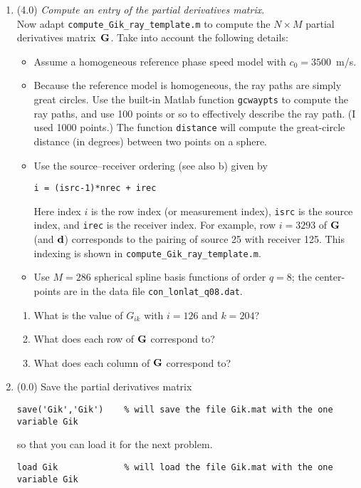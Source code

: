 \documentclass[11pt,titlepage,fleqn]{article}
\begin{document}
\begin{enumerate}

\item (4.0) {\em Compute an entry of the partial derivatives matrix}. \\
Now adapt \verb+compute_Gik_ray_template.m+ to compute the $N \times M$ partial derivatives matrix~$\mbox{${\bf G}$}$.
Take into account the following details:
%
\begin{itemize}
\item Assume a homogeneous reference phase speed model with $c_0 = 3500$~m/s.

\item Because the reference model is homogeneous, the ray paths are simply great circles.  Use the built-in Matlab function \verb+gcwaypts+ to compute the ray paths, and use 100 points or so to effectively describe the ray path. (I used 1000 points.) The function \verb+distance+ will compute the great-circle distance (in degrees) between two points on a sphere.

\item Use the source--receiver ordering (see also b) given by

\begin{verbatim}
i = (isrc-1)*nrec + irec
\end{verbatim}

Here index $i$ is the row index (or measurement index), \verb+isrc+ is the source index, and \verb+irec+ is the receiver index.
For example, row $i=3293$ of $\mbox{${\bf G}$}$ (and $\mbox{${\bf d}$}$) corresponds to the pairing of source 25 with receiver 125.
This indexing is shown in \verb+compute_Gik_ray_template.m+.

\item Use $M=286$ spherical spline basis functions of order $q=8$; the center-points are in the data file \verb+con_lonlat_q08.dat+.
\end{itemize}

\begin{enumerate}
\item What is the value of $G_{ik}$ with $i=126$ and $k=204$?
\item What does each row of $\mbox{${\bf G}$}$ correspond to?
\item What does each column of $\mbox{${\bf G}$}$ correspond to?
\end{enumerate}


\item (0.0) Save the partial derivatives matrix
%
\begin{verbatim}
save('Gik','Gik')    % will save the file Gik.mat with the one variable Gik
\end{verbatim}
%
so that you can load it for the next problem.
%
\begin{verbatim}
load Gik             % will load the file Gik.mat with the one variable Gik
\end{verbatim}

\end{enumerate}
\end{document}
